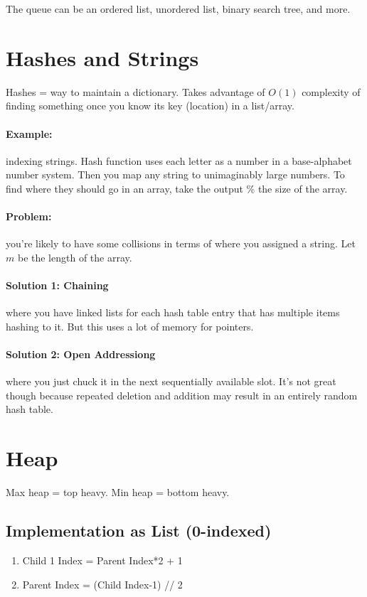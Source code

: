 \documentclass[a4paper,12pt]{report}
\begin{document}
The queue can be an ordered list, unordered list, binary search tree, and more. 

\section{Hashes and Strings}
Hashes = way to maintain a dictionary. Takes advantage of $O(1)$ complexity of finding something once you know its key (location) in a list/array. 

\paragraph{Example: } indexing strings. Hash function uses each letter as a number in a base-alphabet number system. Then you map any string to unimaginably large numbers. To find where they should go in an array, take the output \% the size of the array.

\paragraph{Problem: } you're likely to have some collisions in terms of where you assigned a string. Let $m$ be the length of the array. 

\paragraph{Solution 1: Chaining } where you have linked lists for each hash table entry that has multiple items hashing to it. But this uses a lot of memory for pointers.

\paragraph{Solution 2: Open Addressiong } where you just chuck it in the next sequentially available slot. It's not great though because repeated deletion and addition may result in an entirely random hash table.  

\section{Heap}
Max heap = top heavy. Min heap = bottom heavy.
\subsection{Implementation as List (0-indexed)}
\begin{enumerate}
\item Child 1 Index = Parent Index*2 + 1
\item Parent Index = (Child Index-1) // 2
\end{enumerate}
\end{document}
